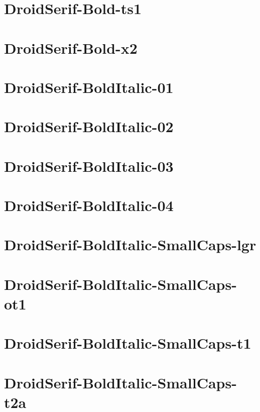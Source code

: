 \documentclass{article}
\begin{document}
\section{DroidSerif-Bold-ts1}

\section{DroidSerif-Bold-x2}

\section{DroidSerif-BoldItalic-01}

\section{DroidSerif-BoldItalic-02}

\section{DroidSerif-BoldItalic-03}

\section{DroidSerif-BoldItalic-04}

\section{DroidSerif-BoldItalic-SmallCaps-lgr}

\section{DroidSerif-BoldItalic-SmallCaps-ot1}

\section{DroidSerif-BoldItalic-SmallCaps-t1}

\section{DroidSerif-BoldItalic-SmallCaps-t2a}
\end{document}
